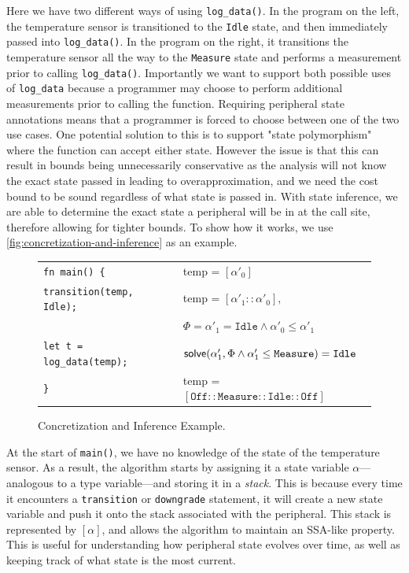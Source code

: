 Here we have two different ways of using \texttt{log\_data()}. In the program on the left, the temperature sensor is  transitioned to the \texttt{Idle} state, and then immediately passed into \texttt{log\_data()}. In the program on the right, it transitions the temperature sensor all the way to the \texttt{Measure} state and performs a measurement prior to calling \texttt{log\_data()}. Importantly we want to support both possible uses of \texttt{log\_data} because a programmer may choose to perform additional measurements prior to calling the function. Requiring peripheral state annotations means that a programmer is forced to choose between one of the two use cases. One potential solution to this is to support "state polymorphism" where the function can accept either state. However the issue is that this can result in bounds being unnecessarily conservative as the analysis will not know the exact state passed in leading to overapproximation, and we need the cost bound to be sound regardless of what state is passed in. With state inference, we are able to determine the exact state a peripheral will be in at the call site, therefore allowing for tighter bounds. To show how it works, we use \autoref{fig:concretization-and-inference} as an example.

\begin{figure}[h]
  \centering
  \small
  \begin{tabular}{ll}
    \texttt{fn main() \{} & temp = $[\alpha'_0]$\\
    \texttt{\quad transition(temp, Idle);} & temp = $[\alpha'_1 :: \alpha'_0],$ \\ \text{} & $\Phi = \alpha'_1 = \texttt{Idle} \land \alpha'_0 \leq \alpha'_1$ \\
    \texttt{\quad let t = log\_data(temp);} & $\mathsf{solve}(\alpha'_1, \Phi \land \alpha'_1 \leq \texttt{Measure}) = \texttt{Idle}$ \\
    \texttt{\}} & temp = $[\texttt{Off} :: \texttt{Measure}  :: \texttt{Idle}:: \texttt{Off}]$\\
  \end{tabular}
  \vspace{-6pt}
  \caption{Concretization and Inference Example.}
  \label{fig:concretization-and-inference}
\end{figure}

At the start of \texttt{main()}, we have no knowledge of the state of the temperature sensor. As a result, the algorithm starts by assigning it a state variable $\alpha$---analogous to a type variable---and storing it in a \textit{stack}. This is because every time it encounters a \texttt{transition} or \texttt{downgrade} statement, it will create a new state variable and push it onto the stack associated with the peripheral. This stack is represented by $[\alpha]$, and allows the algorithm to maintain an SSA-like property. This is useful for understanding how peripheral state evolves over time, as well as keeping track of what state is the most current. 

